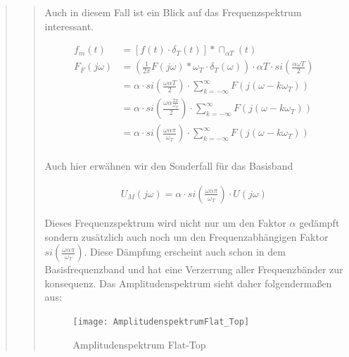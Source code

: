 \begin{quote}
\begin{quote}
        Auch in diesem Fall ist ein Blick auf das Frequenzspektrum interessant.
        
            \begin{equation*}
                \begin{split}
                    f_m (t) &= [f (t) \cdot \delta_T (t)] \ast \sqcap_{\alpha T} (t)\\
                    F_F (j\omega) &= \left ( \frac{1}{2 \pi} F (j\omega) \ast \omega_T
                    \cdot \delta_T (\omega) \right) \cdot \alpha T \cdot si (\frac{\alpha \omega T}{2})\\
                    &= \alpha \cdot si \left( \frac{\omega \alpha T}{2} \right) \cdot \sum_{k=-\infty}^{\infty} F(j(\omega -
                    k\omega_T))\\
                    &= \alpha \cdot si \left( \frac{\omega \alpha \frac{2 \pi}{\omega_T}}{2} \right) \cdot
                    \sum_{k=-\infty}^{\infty} F(j(\omega - k\omega_T))\\
                    &= \alpha \cdot si \left( \frac{\omega \alpha \pi}{\omega_T} \right) \cdot
                    \sum_{k=-\infty}^{\infty} F(j(\omega - k\omega_T))\\
                \end{split}
            \end{equation*}

        Auch hier erwähnen wir den Sonderfall für das Basisband
        
        \begin{equation*}
        	\begin{split}
        		U_M (j\omega) = \alpha \cdot si \left( \frac{\omega \alpha \pi}{\omega_T}\right) \cdot U (j \omega)
        	\end{split}
        \end{equation*}
        
        Dieses Frequenzspektrum wird nicht nur um den Faktor $\alpha$ gedämpft sondern zusätzlich auch noch um den
        Frequenzabhängigen Faktor $si \left( \frac{\omega \alpha \pi}{\omega_T}\right) $. Diese Dämpfung erscheint auch
        schon in dem Basisfrequenzband und hat eine Verzerrung aller Frequenzbänder zur konsequenz. Das
        Amplitudenspektrum sieht daher folgendermaßen aus:
        
        \begin{figure}[H]
        \centering
            \texttt{[image: AmplitudenspektrumFlat\_Top]}
                \caption{Amplitudenspektrum Flat-Top}
                \cite{Amplitudenspektrum_Flat_Top}
        \end{figure}
        

\end{quote}
\end{quote}
